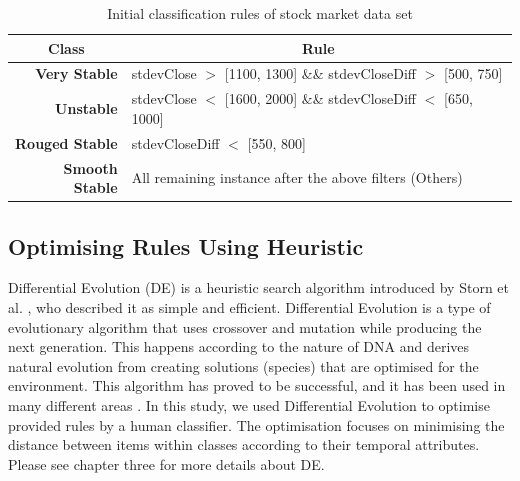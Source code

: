 \begin{table}[!h]
    \small
    \centering
    \caption{Initial classification rules of stock market data set}
    \label{tab:InitialRulesStockMarket}
    \begin{tabular}{rl}
        \toprule
        \multicolumn{1}{c}{Class} & \multicolumn{1}{c}{\textbf{Rule}} \\ 
        
        \midrule
        
        \textbf{Very Stable} & stdevClose $ > $ [1100, 1300] \&\& stdevCloseDiff $ > $ [500, 750]   \\
        
        \textbf{Unstable}    & stdevClose $ < $ [1600, 2000] \&\& stdevCloseDiff $ < $ [650, 1000]   \\
        
        \textbf{Rouged Stable}                & stdevCloseDiff $ < $ [550, 800]        \\ 
        
        \textbf{Smooth Stable}                &  All remaining instance after the above filters (Others)                        \\
        \bottomrule 
    \end{tabular}
\end{table}

\subsection{Optimising Rules Using Heuristic}

Differential Evolution (DE) is a heuristic search algorithm introduced by Storn et al.  \cite{Storn1997}, who described it as simple and efficient. Differential Evolution is a type of evolutionary algorithm that uses crossover and mutation while producing the next generation. This happens according to the nature of DNA and derives natural evolution from creating solutions (species) that are optimised for the environment. This algorithm has proved to be successful, and it has been used in many different areas  \cite{Application2011}.  In this study, we used Differential Evolution to optimise provided rules by a human classifier. The optimisation focuses on minimising the distance between items within classes according to their temporal attributes. Please see chapter three for more details about DE.



